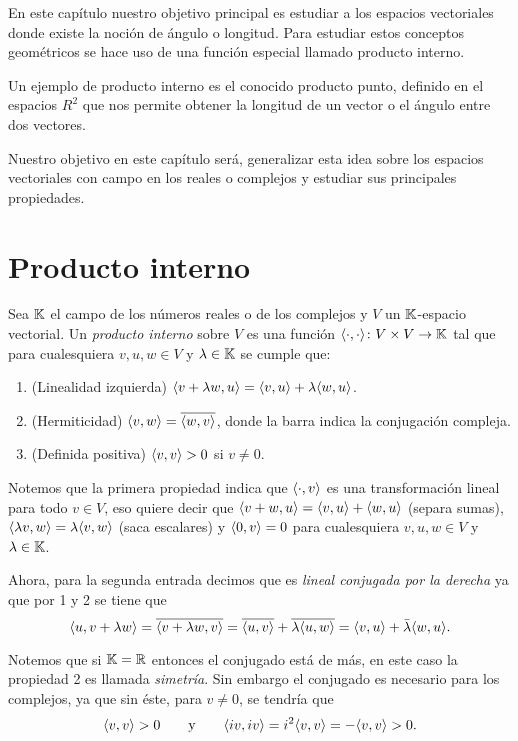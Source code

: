 
En este capítulo nuestro objetivo principal es estudiar a los espacios vectoriales donde existe la noción de ángulo o longitud. Para estudiar estos conceptos geométricos se hace uso de una función especial llamado producto interno.

Un ejemplo de producto interno es el conocido producto punto, definido en el espacios $R^2$ que nos permite obtener la longitud de un vector o el ángulo entre dos vectores.

Nuestro objetivo en este capítulo será, generalizar esta idea sobre los espacios vectoriales con campo en los reales o complejos y estudiar sus principales propiedades.

\section{Producto interno}

\begin{defi}
  Sea $\mathbb{K}$ el campo de los números reales o de los complejos y $V$ un $\mathbb{K}$-espacio vectorial. Un \emph{producto interno} sobre $V$ es una función $\langle\cdot, \cdot\rangle\colon V\times V \to \mathbb{K}$ tal que para cualesquiera $v,u,w \in V$ y $\lambda \in \mathbb{K}$ se cumple que:
    \begin{enumerate}
      \item (Linealidad izquierda) $\langle v+\lambda w, u\rangle = \langle v,u\rangle + \lambda\langle w,u\rangle$.
      \item (Hermiticidad) $\langle v,w\rangle = \overline{\langle w,v\rangle}$, donde la barra indica la conjugación compleja.
      \item (Definida positiva) $\langle v,v\rangle > 0$ si $v\neq 0$.
    \end{enumerate}
\end{defi}

Notemos que la primera propiedad indica que $\langle\cdot, v\rangle$ es una transformación lineal para todo $v \in V$, eso quiere decir que $\langle v+w,u\rangle = \langle v,u\rangle + \langle w,u\rangle$ (separa sumas), $\langle\lambda v, w\rangle = \lambda \langle v,w\rangle$ (saca escalares) y $\langle0,v\rangle = 0$ para cualesquiera $v,u,w \in V$ y $\lambda \in \mathbb{K}$.

Ahora, para la segunda entrada decimos que es \emph{lineal conjugada por la derecha} ya que por 1 y 2 se tiene que
  \[
    \langle u, v + \lambda w\rangle = \overline{\langle v + \lambda w, v\rangle} = \overline{\langle u,v\rangle} +  \overline{\lambda \langle u,w\rangle} = \langle v,u\rangle + \bar\lambda \langle w,u\rangle.
  \]

Notemos que si $\mathbb{K}=\mathbb{R}$ entonces el conjugado está de más, en este caso la propiedad 2 es llamada \emph{simetría}. Sin embargo el conjugado es necesario para los complejos, ya que sin éste, para $v\neq 0$, se tendría que 
  \[
    \langle v,v\rangle>0 \qquad\text{y}\qquad \langle iv, iv\rangle = i^2 \langle v,v\rangle = -\langle v,v\rangle>0.
  \]

